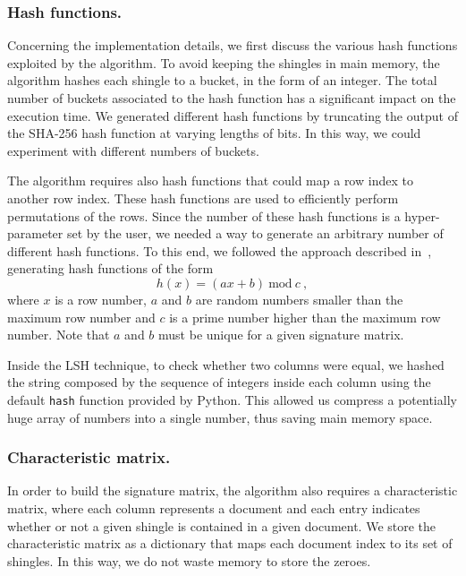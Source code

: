 \documentclass[runningheads]{llncs}
\begin{document}
\subsubsection{Hash functions.} Concerning the implementation details, we first discuss the various hash functions exploited by the algorithm. To avoid keeping the shingles in main memory, the algorithm hashes each shingle to a bucket, in the form of an integer. The total number of buckets associated to the hash function has a significant impact on the execution time. We generated different hash functions by truncating the output of the SHA-256 hash function at varying lengths of bits. In this way, we could experiment with different numbers of buckets.  

The algorithm requires also hash functions that could map a row index to another row index. These hash functions are used to efficiently perform permutations of the rows. Since the number of these hash functions is a hyper-parameter set by the user, we needed a way to generate an arbitrary number of different hash functions. To this end, we followed the approach described in~\cite{liu_2015}, generating hash functions of the form
\[
  h(x) = (ax + b)~\text{mod}~c~,  
\]
where $x$ is a row number, $a$ and $b$ are random numbers smaller than the maximum row number and $c$ is a prime number higher than the maximum row number. Note that $a$ and $b$ must be unique for a given signature matrix.

Inside the LSH technique, to check whether two columns were equal, we hashed the string composed by the sequence of integers inside each column using the default \texttt{hash} function provided by Python. This allowed us compress a potentially huge array of numbers into a single number, thus saving main memory space. 

\subsubsection{Characteristic matrix.} In order to build the signature matrix, the algorithm also requires a characteristic matrix, where each column represents a document and each entry indicates whether or not a given shingle is contained in a given document. We store the characteristic matrix as a dictionary that maps each document index to its set of shingles. In this way, we do not waste memory to store the zeroes.
\end{document}
